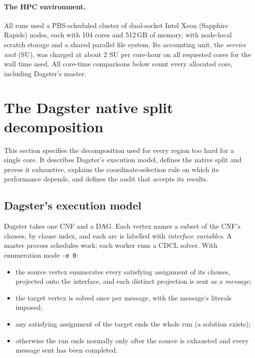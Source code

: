 \documentclass[11pt,a4paper]{article}
\theoremstyle{definition}
\newcommand{\code}[1]{\texttt{#1}}
\begin{document}
\paragraph{The HPC environment.} All runs used a PBS-scheduled cluster of dual-socket Intel Xeon
(Sapphire Rapids) nodes, each with 104 cores and 512\,GB of memory, with node-local scratch
storage and a shared parallel file system. Its accounting unit, the \emph{service unit} (SU), was
charged at about 2 SU per core-hour on all requested cores for the wall time used. All core-time
comparisons below count every allocated core, including Dagster's master.

\section{The Dagster native split decomposition}\label{sec:decomp}
This section specifies the decomposition used for every region too hard for a single core. It describes Dagster's execution model, defines the native split and proves it exhaustive, explains the coordinate-selection rule on which its performance depends, and defines the audit that accepts its results.


\subsection{Dagster's execution model}

Dagster takes one CNF and a DAG. Each vertex names a subset of the CNF's clauses, by clause
index, and each arc is labelled with \emph{interface variables}. A master process schedules
work; each worker runs a CDCL solver. With enumeration mode \code{-e 0}:
\begin{itemize}
\item the source vertex enumerates every satisfying assignment of its clauses, projected onto
the interface, and each distinct projection is sent as a \emph{message};
\item the target vertex is solved once per message, with the message's literals imposed;
\item any satisfying assignment of the target ends the whole run (a solution exists);
\item otherwise the run ends normally only after the source is exhausted and every message
sent has been completed.
\end{itemize}
\end{document}
